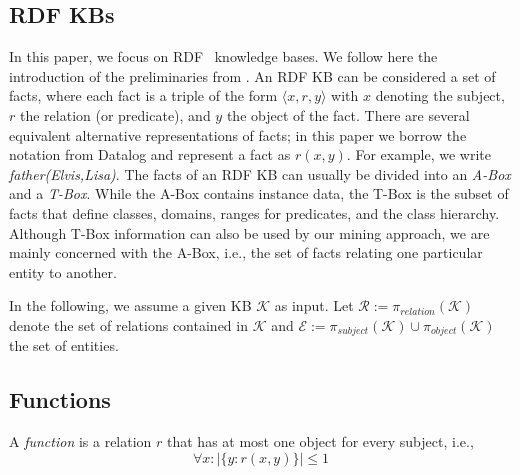 
\subsection{RDF KBs}
In this paper, we focus on RDF~\cite{rdf} knowledge bases.  We follow here the introduction of the preliminaries from \cite{amie}.
An RDF KB can be considered a set of facts, where each fact is a triple of the form $\langle x, r, y\rangle$ with $x$ denoting the subject, $r$ the relation (or predicate), and $y$ the object of the fact. %
There are several equivalent alternative representations of facts; in this paper we borrow the notation from Datalog and represent a fact as $r(x,y)$. For example, we write \emph{father(Elvis,Lisa)}.
The facts of an RDF KB can usually be divided into an \emph{A-Box} and a \emph{T-Box}. While the A-Box contains instance data, the T-Box is the subset of facts that define classes, domains, ranges for predicates, and the class hierarchy. Although T-Box information can also be used by our mining approach, we are mainly concerned with the A-Box, i.e., the set of facts relating one particular entity to another.

In the following, we assume a given KB $\mathcal{K}$ as input. Let $\mathcal{R}:=\pi_{relation}(\mathcal{K})$ 
denote the set of relations contained in $\mathcal{K}$ and $\mathcal{E}:=\pi_{subject}(\mathcal{K}) \cup \pi_{object}(\mathcal{K})$ the set of entities.


\subsection{Functions}
\label{subsec:functions}
A \emph{function} is a relation $r$ that has at most one object for every subject, i.e.,
\[
 \forall x: |\{y: r(x,y)\}| \leq 1
\]


